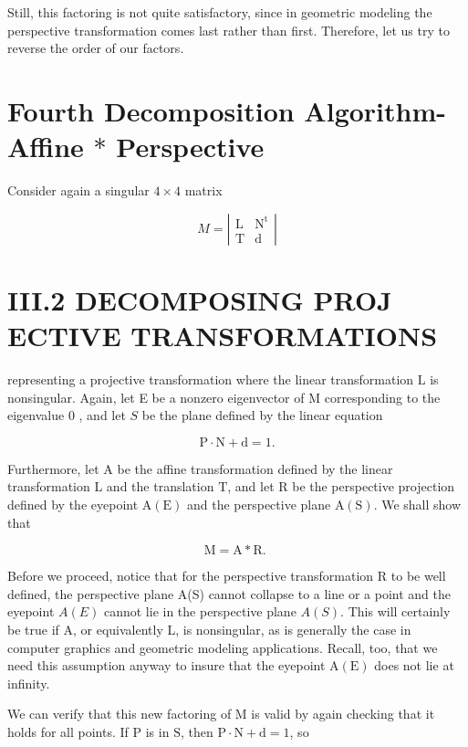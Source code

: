 Still, this factoring is not quite satisfactory, since in geometric modeling the perspective transformation comes last rather than first. Therefore, let us try to reverse the order of our factors.

\section{Fourth Decomposition Algorithm- Affine $*$ Perspective}
Consider again a singular $4 \times 4$ matrix

$$
M=\left|\begin{array}{cc}
\mathrm{L} & \mathrm{N}^{\mathrm{t}} \\
\mathrm{T} & \mathrm{d}
\end{array}\right|
$$

\section{III.2 DECOMPOSING PROJ ECTIVE TRANSFORMATIONS}
representing a projective transformation where the linear transformation $\mathrm{L}$ is nonsingular. Again, let E be a nonzero eigenvector of M corresponding to the eigenvalue 0 , and let $S$ be the plane defined by the linear equation

$$
\mathrm{P} \cdot \mathrm{N}+\mathrm{d}=1 .
$$

Furthermore, let A be the affine transformation defined by the linear transformation $\mathrm{L}$ and the translation $\mathrm{T}$, and let $\mathrm{R}$ be the perspective projection defined by the eyepoint $\mathrm{A}(\mathrm{E})$ and the perspective plane $\mathrm{A}(\mathrm{S})$. We shall show that

$$
\mathrm{M}=\mathrm{A} * \mathrm{R} \text {. }
$$

Before we proceed, notice that for the perspective transformation $\mathrm{R}$ to be well defined, the perspective plane A(S) cannot collapse to a line or a point and the eyepoint $A(E)$ cannot lie in the perspective plane $A(S)$. This will certainly be true if A, or equivalently L, is nonsingular, as is generally the case in computer graphics and geometric modeling applications. Recall, too, that we need this assumption anyway to insure that the eyepoint $\mathrm{A}(\mathrm{E})$ does not lie at infinity.

We can verify that this new factoring of $\mathrm{M}$ is valid by again checking that it holds for all points. If $\mathrm{P}$ is in $\mathrm{S}$, then $\mathrm{P} \cdot \mathrm{N}+\mathrm{d}=1$, so

